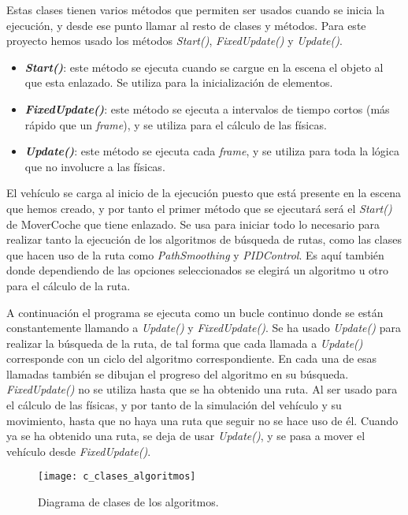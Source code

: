 Estas clases tienen varios métodos que permiten ser usados cuando se inicia la ejecución, y desde ese punto llamar al resto de clases y métodos. Para este proyecto hemos usado los métodos \textit{Start()}, \textit{FixedUpdate()} y \textit{Update()}.
\begin{itemize}
\item \textbf{\textit{Start()}}: este método se ejecuta cuando se cargue en la escena el objeto al que esta enlazado. Se utiliza para la inicialización de elementos.
\item \textbf{\textit{FixedUpdate()}}: este método se ejecuta a intervalos de tiempo cortos (más rápido que un \textit{frame}), y se utiliza para el cálculo de las físicas.
\item \textbf{\textit{Update()}}: este método se ejecuta cada \textit{frame}, y se utiliza para toda la lógica que no involucre a las físicas.
\end{itemize}

El vehículo se carga al inicio de la ejecución puesto que está presente en la escena que hemos creado, y por tanto el primer método que se ejecutará será el \textit{Start()} de MoverCoche que tiene enlazado. Se usa para iniciar todo lo necesario para realizar tanto la ejecución de los algoritmos de búsqueda de rutas, como las clases que hacen uso de la ruta como \textit{PathSmoothing} y \textit{PIDControl}. Es aquí también donde dependiendo de las opciones seleccionados se elegirá un algoritmo u otro para el cálculo de la ruta.

A continuación el programa se ejecuta como un bucle continuo donde se están constantemente llamando a \textit{Update()} y \textit{FixedUpdate()}. Se ha usado \textit{Update()} para realizar la búsqueda de la ruta, de tal forma que cada llamada a \textit{Update()} corresponde con un ciclo del algoritmo correspondiente. En cada una de esas llamadas también se dibujan el progreso del algoritmo en su búsqueda. \textit{FixedUpdate()} no se utiliza hasta que se ha obtenido una ruta. Al ser usado para el cálculo de las físicas, y por tanto de la simulación del vehículo y su movimiento, hasta que no haya una ruta que seguir no se hace uso de él. Cuando ya se ha obtenido una ruta, se deja de usar \textit{Update()}, y se pasa a mover el vehículo desde \textit{FixedUpdate()}.

\begin{figure}[htpb]
    \centering
    \texttt{[image: c\_clases\_algoritmos]}
    \caption[Diagrama de clases de los algoritmos]{Diagrama de clases de los algoritmos.}
    \label{fig:cclasesalgoritmos}
\end{figure}

